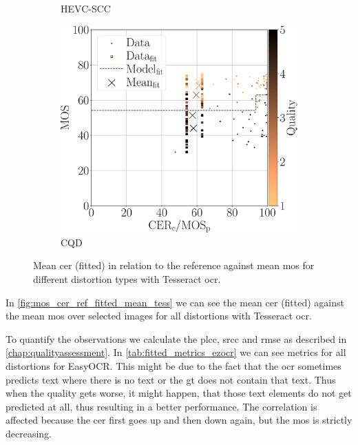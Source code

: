 \begin{figure}[h]
\begin{subfigure}[b]{0.3\textwidth}
        \caption{HEVC-SCC}
        \label{fig:mos_cer_ref_fitted_mean_tess_HEVC-SCC}
    \end{subfigure}
    \hfill
    \begin{subfigure}[b]{0.3\textwidth}
        \includegraphics[width=\textwidth]{../../images/analyze/mos_cer_ref_fitted_mean_tess_CQD.pdf}
        \caption{CQD}
        \label{fig:mos_cer_ref_fitted_mean_tess_CQD}
    \end{subfigure}
    \caption{Mean \gls{cer} (fitted) in relation to the reference against mean \gls{mos} for different distortion types with Tesseract \gls{ocr}.}
\label{fig:mos_cer_ref_fitted_mean_tess}
\end{figure}

In \autoref{fig:mos_cer_ref_fitted_mean_tess} we can see the mean \gls{cer} (fitted) against the mean \gls{mos} over selected images for all distortions with Tesseract \gls{ocr}.

To quantify the observations we calculate the \gls{plcc}, \gls{srcc} and \gls{rmse} as described in \autoref{chap:qualityassessment}.
In \autoref{tab:fitted_metrics_ezocr} we can see metrics for all distortions for EasyOCR.
This might be due to the fact that the \gls{ocr} sometimes predicts text where there is no text or the \gls{gt} does not contain that text.
Thus when the quality gets worse, it might happen, that those text elements do not get predicted at all, thus resulting in a better performance.
The correlation is affected because the \gls{cer} first goes up and then down again, but the \gls{mos} is strictly decreasing.

